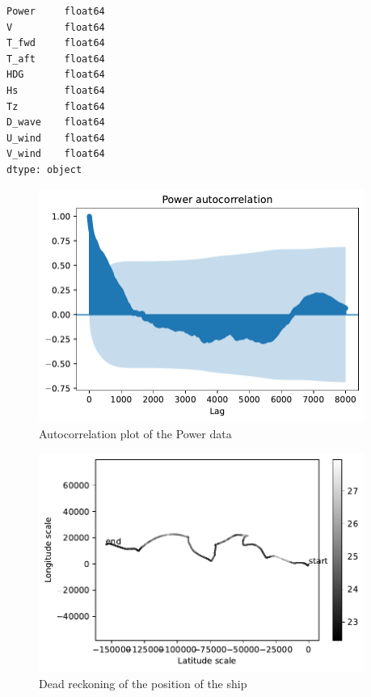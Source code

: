 \begin{verbatim}
Power     float64
V         float64
T_fwd     float64
T_aft     float64
HDG       float64
Hs        float64
Tz        float64
D_wave    float64
U_wind    float64
V_wind    float64
dtype: object
\end{verbatim}
\begin{figure}[H]
\begin{center}\includegraphics[width = 0.95\textwidth]{figures/power_autocorrelation.pdf}\end{center}
\vspace{-0.7cm}
\caption{Autocorrelation plot of the Power data}
\label{fig:power_autocorrelation}
\end{figure}
\begin{figure}[H]
\begin{center}\includegraphics[width = 0.95\textwidth]{figures/dead_reckoning.pdf}\end{center}
\vspace{-0.7cm}
\caption{Dead reckoning of the position of the ship}
\label{fig:dead_reckoning}
\end{figure}

